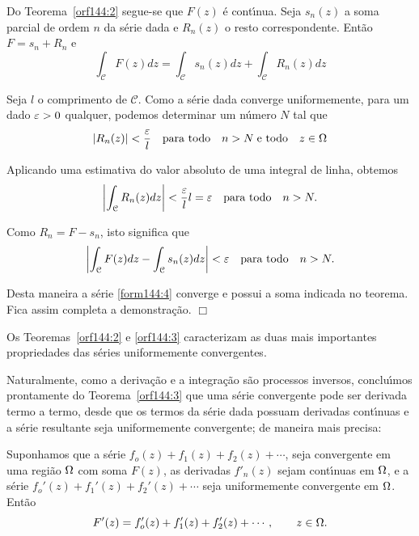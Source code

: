 \prova Do Teorema~\ref{orf144:2} segue-se que $F(z)$ \'{e} cont\'{\i}nua.
Seja $s_n(z)$ a soma parcial de ordem $n$ da s\'{e}rie dada e $R_n(z)$
o resto correspondente. Ent\~{a}o $F=s_n+R_n$ e
\begin{equation*}
\int_{\mathcal{C}}F(z)dz=\int_{\mathcal{C}}s_n(z)dz+\int_{\mathcal{C}}R_n(z)dz
\end{equation*}

Seja $l$ o comprimento de $\mathcal{C}$. Como a s\'{e}rie dada
converge uniformemente, para um dado $\varepsilon > 0$ qualquer, podemos
determinar um n\'{u}mero $N$ tal que
\begin{equation*}
|R_n(z)|<\frac{\varepsilon}{l}\quad \text{para todo}\quad n> N\; \text{e
todo}\quad z\in \Omega
\end{equation*}

Aplicando uma estimativa do valor absoluto de uma integral de
linha, obtemos
\begin{equation*}
\left|\int_{\mathcal{C}}R_n(z)dz\right| <
\frac{\varepsilon}{l}l=\varepsilon\quad \text{para todo}\quad n> N.
\end{equation*}

Como $R_n= F - s_n$, isto significa que
\begin{equation*}
\left|\int_{\mathcal{C}}F(z)dz - \int_{\mathcal{C}}s_n(z)dz\right|
< \varepsilon\quad \text{para todo}\quad n> N.
\end{equation*}

Desta maneira a s\'{e}rie \eqref{form144:4} converge e possui a soma
indicada no teorema. Fica assim completa a demonstra\c{c}\~{a}o. \hfill
$\Box$


Os Teoremas~\ref{orf144:2} e \ref{orf144:3} caracterizam as duas
mais importantes propriedades das s\'{e}ries uniformemente
convergentes.

Naturalmente, como a deriva\c{c}\~{a}o e a integra\c{c}\~{a}o s\~{a}o processos
inversos, conclu\'{\i}mos prontamente do Teorema~\ref{orf144:3} que uma
s\'{e}rie convergente pode ser derivada termo a termo, desde que os
termos da s\'{e}rie dada possuam derivadas cont\'{\i}nuas e a s\'{e}rie
resultante seja uniformemente convergente; de maneira mais
precisa:

\begin{teo}\label{orf144:4}
Suponhamos que a s\'{e}rie $f_o(z) + f_1(z) + f_2(z)+\cdots$, seja
convergente em uma regi\~{a}o $\Omega$ com soma $F(z)$, as derivadas
$f'_n(z)$ sejam cont\'{\i}nuas em $\Omega$, e a s\'{e}rie $f_o'(z) + f_1'(z) +
f_2'(z) + \cdots$ seja uniformemente convergente em $\Omega$. Ent\~{a}o
\begin{equation*}
F'(z) = f_o'(z) + f_1'(z)+ f_2'(z) +\cdots,\qquad    z \in \Omega.
\end{equation*}
\end{teo}

